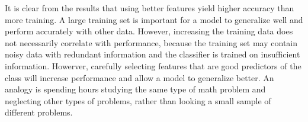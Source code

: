 It is clear from the results that using better features yield higher accuracy than more training. A large training set is important for a model to generalize well and perform accurately with other data. However, increasing the training data does not necessarily correlate with performance, because the training set may contain noisy data with redundant information and the classifier is trained on insufficient information. Howerver, carefully selecting features that are good predictors of the class will increase performance and allow a model to generalize better. An analogy is spending hours studying the same type of math problem and neglecting other types of problems, rather than looking a small sample of different problems. 

